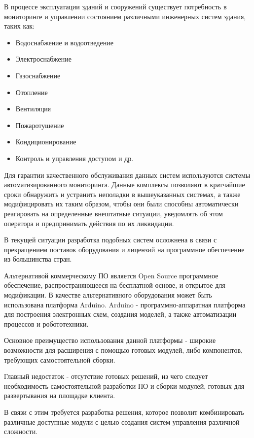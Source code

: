 \newpage
{}
В процессе эксплуатации зданий и сооружений существует потребность в мониторинге и управлении состоянием различными инженерных систем здания, таких как:

\begin{itemize}
	\itemsep0em 
	\item Водоснабжение и водоотведение
	\item Электроснабжение
	\item Газоснабжение
	\item Отопление
	\item Вентиляция
	\item Пожаротушение
	\item Кондиционирование
	\item Контроль и управления доступом и др.
\end{itemize}

Для гарантии качественного обслуживания данных систем используются системы автоматизированного мониторинга.
Данные комплексы позволяют в кратчайшие сроки обнаружить и устранить неполадки в вышеуказанных системах, а также модифицировать их таким образом, чтобы они были способны автоматически реагировать на определенные внештатные ситуации, уведомлять об этом оператора и предпринимать действия по их ликвидации.

В текущей ситуации разработка подобных систем осложнена в связи с прекращением поставок оборудования и лицензий на программное обеспечение из большинства стран.

Альтернативой коммерческому ПО является Open Source программное обеспечение, распространяющееся на бесплатной основе, и открытое для модификации.
В качестве альтернативного оборудования может быть использована платформа Arduino.
Arduino - программно-аппаратная платформа для построения электронных схем, создания моделей, а также автоматизации процессов и робототехники.

Основное преимущество использования данной платформы - широкие возможности для расширения с помощью готовых модулей, либо компонентов, требующих самостоятельной сборки.

Главный недостаток - отсутствие готовых решений, из чего следует необходимость самостоятельной разработки ПО и сборки модулей, готовых для развертывания на площадке клиента.

В связи с этим требуется разработка решения, которое позволит комбинировать различные доступные модули с целью создания систем управления различной сложности.


